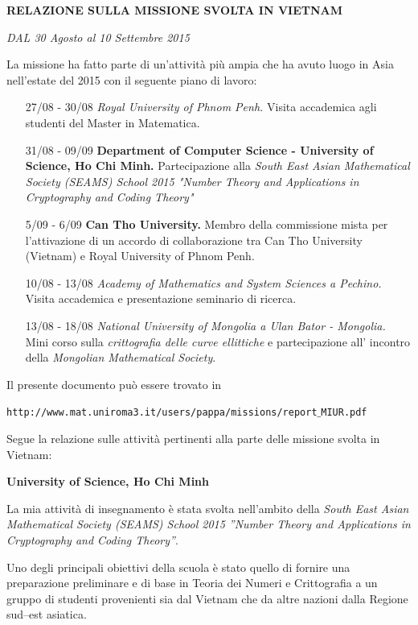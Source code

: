 \documentclass[12pt,a4paper]{letter}
\begin{document}

\begin{letter}

\centerline{\textbf{RELAZIONE SULLA MISSIONE SVOLTA IN VIETNAM}}
\centerline{\textit{ DAL 30 Agosto al 10 Settembre 2015}}

La missione ha fatto parte di un'attivit\`a pi\`u ampia che ha avuto luogo in Asia nell'estate del 2015 con il seguente piano 
di lavoro:

\begin{itemize}
 \item[27/08 - 30/08] 
\textit{Royal University of Phnom Penh.} Visita accademica agli studenti del Master in Matematica.
\item[31/08 - 09/09] 
\textbf{Department of Computer Science - University of Science, Ho Chi Minh.}
Partecipazione alla \textit{South East Asian Mathematical Society (SEAMS) School 2015 
"Number Theory and Applications in Cryptography and Coding Theory"}
\item[5/09 - 6/09]  
\textbf{Can Tho University.}
Membro della commissione mista per l'attivazione di un accordo di collaborazione tra Can Tho University (Vietnam) e Royal University of Phnom Penh.
\item[10/08 - 13/08] 
\textit{Academy of Mathematics and System Sciences a Pechino.}
Visita accademica e presentazione seminario di ricerca.
\item[13/08 - 18/08]
\textit{National University of Mongolia a Ulan Bator - Mongolia.} Mini corso sulla \emph{crittografia delle curve ellittiche} e 
partecipazione all' incontro della \textit{Mongolian Mathematical Society}. 
 \end{itemize}

Il presente documento pu\`o essere trovato in

\small{\texttt{http://www.mat.uniroma3.it/users/pappa/missions/report$\_$MIUR.pdf}}
 
Segue la relazione sulle attivit\`a pertinenti alla parte delle missione svolta in Vietnam:\bigskip

\centerline{\Large{\textbf{University of Science, Ho Chi Minh}}}

La mia attivit\`a di insegnamento \`e stata svolta nell'ambito della
\textit{South East Asian Mathematical Society (SEAMS) School 2015 
''Number Theory and Applications in Cryptography and Coding Theory''}.

Uno degli principali obiettivi della scuola \`e stato quello di fornire una preparazione preliminare
e di base in Teoria dei Numeri e Crittografia a un gruppo di studenti provenienti sia dal Vietnam
che da altre nazioni dalla Regione sud--est asiatica.


\end{letter}
\end{document}
